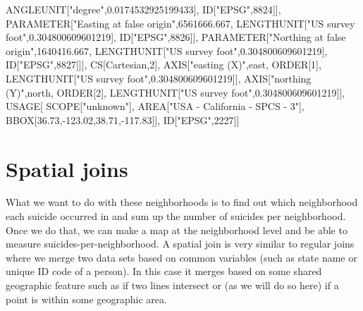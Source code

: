 \documentclass[
  12pt,
]{book}
\newenvironment{Shaded}{\begin{snugshade}}{\end{snugshade}}
\newcommand{\DecValTok}[1]{\textcolor[rgb]{0.06,0.06,0.06}{#1}}
\newcommand{\FloatTok}[1]{\textcolor[rgb]{0.06,0.06,0.06}{#1}}
\newcommand{\NormalTok}[1]{#1}
\newcommand{\SpecialCharTok}[1]{\textcolor[rgb]{0,0,0}{#1}}
\newcommand{\StringTok}[1]{\textcolor[rgb]{0.5,0.5,0.5}{#1}}
\begin{document}
\begin{Shaded}
\begin{Highlighting}[]
\NormalTok{            ANGLEUNIT[}\StringTok{"degree"}\NormalTok{,}\FloatTok{0.0174532925199433}\NormalTok{],}
\NormalTok{            ID[}\StringTok{"EPSG"}\NormalTok{,}\DecValTok{8824}\NormalTok{]],}
\NormalTok{        PARAMETER[}\StringTok{"Easting at false origin"}\NormalTok{,}\FloatTok{6561666.667}\NormalTok{,}
\NormalTok{            LENGTHUNIT[}\StringTok{"US survey foot"}\NormalTok{,}\FloatTok{0.304800609601219}\NormalTok{],}
\NormalTok{            ID[}\StringTok{"EPSG"}\NormalTok{,}\DecValTok{8826}\NormalTok{]],}
\NormalTok{        PARAMETER[}\StringTok{"Northing at false origin"}\NormalTok{,}\FloatTok{1640416.667}\NormalTok{,}
\NormalTok{            LENGTHUNIT[}\StringTok{"US survey foot"}\NormalTok{,}\FloatTok{0.304800609601219}\NormalTok{],}
\NormalTok{            ID[}\StringTok{"EPSG"}\NormalTok{,}\DecValTok{8827}\NormalTok{]]],}
\NormalTok{    CS[Cartesian,}\DecValTok{2}\NormalTok{],}
\NormalTok{        AXIS[}\StringTok{"easting (X)"}\NormalTok{,east,}
\NormalTok{            ORDER[}\DecValTok{1}\NormalTok{],}
\NormalTok{            LENGTHUNIT[}\StringTok{"US survey foot"}\NormalTok{,}\FloatTok{0.304800609601219}\NormalTok{]],}
\NormalTok{        AXIS[}\StringTok{"northing (Y)"}\NormalTok{,north,}
\NormalTok{            ORDER[}\DecValTok{2}\NormalTok{],}
\NormalTok{            LENGTHUNIT[}\StringTok{"US survey foot"}\NormalTok{,}\FloatTok{0.304800609601219}\NormalTok{]],}
\NormalTok{    USAGE[}
\NormalTok{        SCOPE[}\StringTok{"unknown"}\NormalTok{],}
\NormalTok{        AREA[}\StringTok{"USA {-} California {-} SPCS {-} 3"}\NormalTok{],}
\NormalTok{        BBOX[}\FloatTok{36.73}\NormalTok{,}\SpecialCharTok{{-}}\FloatTok{123.02}\NormalTok{,}\FloatTok{38.71}\NormalTok{,}\SpecialCharTok{{-}}\FloatTok{117.83}\NormalTok{]],}
\NormalTok{    ID[}\StringTok{"EPSG"}\NormalTok{,}\DecValTok{2227}\NormalTok{]]}
\end{Highlighting}
\end{Shaded}

\hypertarget{spatial-joins}{%
\section{Spatial joins}\label{spatial-joins}}

What we want to do with these neighborhoods is to find out which neighborhood each suicide occurred in and sum up the number of suicides per neighborhood. Once we do that, we can make a map at the neighborhood level and be able to measure suicides-per-neighborhood. A spatial join is very similar to regular joins where we merge two data sets based on common variables (such as state name or unique ID code of a person). In this case it merges based on some shared geographic feature such as if two lines intersect or (as we will do so here) if a point is within some geographic area.
\end{document}
